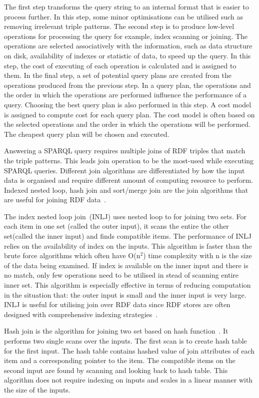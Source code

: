 {The first step transforms the query string to an internal format that is easier to process further. 
In this step, some minor optimisations can be utilised such as removing irrelevant triple patterns.
The second step is to produce low-level operations for processing the query for example, index scanning or joining.
The operations are selected associatively with the information, such as data structure on disk, availability of indexes or statistic of data, to speed up the query. 
In this step, the cost of executing of each operation is calculated and is assigned to them.
In the final step, a set of potential query plans are created from the operations produced from the previous step. 
In a query plan, the operations and the order in which the operations are performed influence the performance of a query.
Choosing the best query plan is also performed in this step. 
A cost model is assigned to compute cost for each query plan.
The cost model is often based on the selected operations and the order in which the operations will be performed.
The cheapest query plan will be chosen and executed.

Answering a SPARQL query requires multiple joins of RDF triples that match the triple patterns.
This leads join operation to be the most-used while executing SPARQL queries. 
Different join algorithms are differentiated by how the input data is organised and require different amount of computing resource to perform.
Indexed nested loop, hash join and sort/merge join are the join algorithms that are useful for joining RDF data~\citep{Owens:2011}.

The index nested loop join~\citep{DeWitt:1993}(INLJ) uses nested loop to for joining two sets. 
For each item in one set (called the outer input), it scans the entire the other set(called the inner input) and finds compatible items.
The performance of INLJ relies on the availability of index on the inputs.
This algorithm is faster than the brute force algorithms which often have O(n$^{2}$) time complexity with n is the size of the data being examined.
If index is available on the inner input and there is no match, only few operations need to be utilised in stead of scanning entire inner set.
This algorithm is especially effective in terms of reducing computation in the situation that:
the outer input is small and the inner input is very large.
INLJ is useful for utilising join over RDF data since RDF stores are often designed with comprehensive indexing strategies~\citep{Owens:2011}.

Hash join is the algorithm for joining two set based on hash function~\citep{Ullman:2001}. 
It performs two single scans over the inputs.
The first scan is to create hash table for the first input.
The hash table contains hashed value of join attributes of each item and a corresponding pointer to the item. 
The compatible items on the second input are found by scanning and looking back to hash table.
This algorithm does not require indexing on inputs and scales in a linear manner with the size of the inputs.

}
